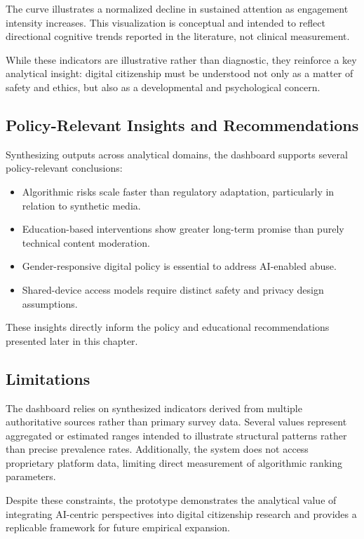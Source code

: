 \documentclass[12pt,a4paper]{report}
\begin{document}
The curve illustrates a normalized decline in sustained attention as engagement intensity increases. This visualization is conceptual and intended to reflect directional cognitive trends reported in the literature, not clinical measurement.

\newpage
While these indicators are illustrative rather than diagnostic, they reinforce a key analytical insight: digital citizenship must be understood not only as a matter of safety and ethics, but also as a developmental and psychological concern.

\subsection{Policy-Relevant Insights and Recommendations}

Synthesizing outputs across analytical domains, the dashboard supports several policy-relevant conclusions:

\begin{itemize}
  \item Algorithmic risks scale faster than regulatory adaptation, particularly in relation to synthetic media.
  \item Education-based interventions show greater long-term promise than purely technical content moderation.
  \item Gender-responsive digital policy is essential to address AI-enabled abuse.
  \item Shared-device access models require distinct safety and privacy design assumptions.
\end{itemize}

These insights directly inform the policy and educational recommendations presented later in this chapter.

\subsection{Limitations}

The dashboard relies on synthesized indicators derived from multiple authoritative sources rather than primary survey data. Several values represent aggregated or estimated ranges intended to illustrate structural patterns rather than precise prevalence rates. Additionally, the system does not access proprietary platform data, limiting direct measurement of algorithmic ranking parameters.

Despite these constraints, the prototype demonstrates the analytical value of integrating AI-centric perspectives into digital citizenship research and provides a replicable framework for future empirical expansion.
\end{document}

